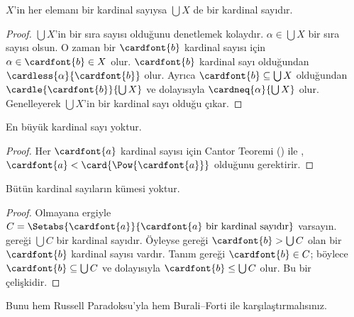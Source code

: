 \begin{prop}
$X$'in her elemanı bir kardinal sayıysa $\bigcup X$ de bir kardinal sayıdır.
\end{prop}

\begin{proof}
$\bigcup X$'in bir sıra sayısı olduğunu denetlemek kolaydır.
$\alpha\in\bigcup X$ bir sıra sayısı olsun. O zaman bir $\cardfont{b}$
kardinal sayısı için $\alpha\in\cardfont{b}\in X$ olur.
$\cardfont{b}$ kardinal sayı olduğundan
$\cardless{\alpha}{\cardfont{b}}$ olur. Ayrıca
$\cardfont{b}\subseteq\bigcup X$ olduğundan
$\cardle{\cardfont{b}}{\bigcup X}$ ve dolayısıyla
$\cardneq{\alpha}{\bigcup X}$ olur. Genelleyerek $\bigcup X$'in bir
kardinal sayı olduğu çıkar.
\end{proof}

\begin{thm}
En büyük kardinal sayı yoktur.
\end{thm}

\begin{proof}
Her $\cardfont{a}$ kardinal sayısı için Cantor Teoremi
() ile
,
$\cardfont{a}<\card{\Pow{\cardfont{a}}}$ olduğunu gerektirir.
\end{proof}

\begin{thm}
Bütün kardinal sayıların kümesi yoktur.
\end{thm}

\begin{proof}
Olmayana ergiyle
$C=\Setabs{\cardfont{a}}{\cardfont{a}\text{ bir kardinal sayıdır}}$
varsayın.  gereği $\bigcup C$ bir kardinal
sayıdır. Öyleyse  gereği
$\cardfont{b}>\bigcup C$ olan bir $\cardfont{b}$ kardinal sayısı vardır.
Tanım gereği $\cardfont{b}\in C$; böylece
$\cardfont{b}\subseteq\bigcup C$ ve dolayısıyla
$\cardfont{b}\leq\bigcup C$ olur. Bu bir çelişkidir.
\end{proof}

Bunu hem Russell Paradoksu'yla hem Burali--Forti ile karşılaştırmalısınız.

